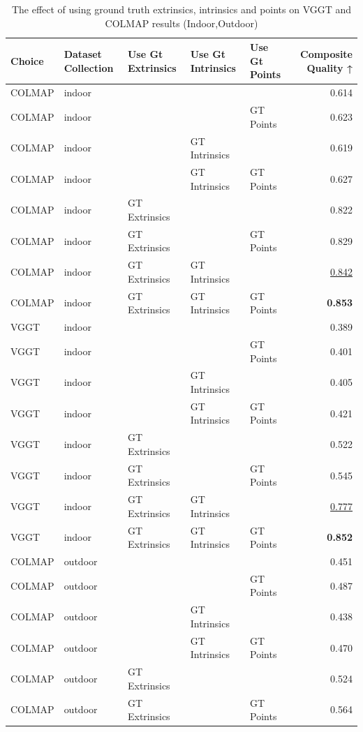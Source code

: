 \begin{table}[H]
\caption{\ifdefined\customcaption \customcaption \else The effect of using ground truth extrinsics, intrinsics and points on VGGT and COLMAP results (Indoor,Outdoor) \fi}
\label{tab:06_gt_cams_indoor,outdoor}
\centering
\scriptsize
\begin{tabular}{lllllr}
\toprule
Choice & Dataset Collection & Use Gt Extrinsics & Use Gt Intrinsics & Use Gt Points & Composite Quality ↑ \\
\midrule
COLMAP & indoor &  &  &  & 0.614 \\
COLMAP & indoor &  &  & GT Points & 0.623 \\
COLMAP & indoor &  & GT Intrinsics &  & 0.619 \\
COLMAP & indoor &  & GT Intrinsics & GT Points & 0.627 \\
COLMAP & indoor & GT Extrinsics &  &  & 0.822 \\
COLMAP & indoor & GT Extrinsics &  & GT Points & 0.829 \\
COLMAP & indoor & GT Extrinsics & GT Intrinsics &  & \underline{0.842} \\
COLMAP & indoor & GT Extrinsics & GT Intrinsics & GT Points & \textbf{0.853} \\
\midrule
VGGT & indoor &  &  &  & 0.389 \\
VGGT & indoor &  &  & GT Points & 0.401 \\
VGGT & indoor &  & GT Intrinsics &  & 0.405 \\
VGGT & indoor &  & GT Intrinsics & GT Points & 0.421 \\
VGGT & indoor & GT Extrinsics &  &  & 0.522 \\
VGGT & indoor & GT Extrinsics &  & GT Points & 0.545 \\
VGGT & indoor & GT Extrinsics & GT Intrinsics &  & \underline{0.777} \\
VGGT & indoor & GT Extrinsics & GT Intrinsics & GT Points & \textbf{0.852} \\
\midrule
COLMAP & outdoor &  &  &  & 0.451 \\
COLMAP & outdoor &  &  & GT Points & 0.487 \\
COLMAP & outdoor &  & GT Intrinsics &  & 0.438 \\
COLMAP & outdoor &  & GT Intrinsics & GT Points & 0.470 \\
COLMAP & outdoor & GT Extrinsics &  &  & 0.524 \\
COLMAP & outdoor & GT Extrinsics &  & GT Points & 0.564 \\

\end{tabular}
\end{table}
